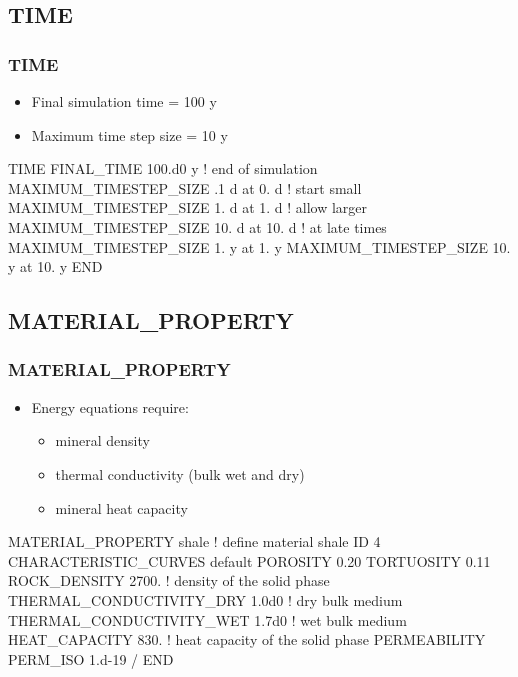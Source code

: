 \documentclass{beamer}
\newcommand\redcomment[1]{{{\color{red} #1}}}
\newcommand\bluecomment[1]{{{\color{blue} #1}}}
\newcommand\greencomment[1]{{{\color{green} #1}}}
\begin{document}
\subsection{TIME}

\begin{frame}[fragile]\frametitle{TIME}
\begin{itemize}
  \item \redcomment{Final} simulation \redcomment{time} = 100 y
  \item \redcomment{Maximum time step size} = 10 y
\end{itemize}

\begin{semiverbatim}

TIME
  FINAL_TIME 100.d0 y \bluecomment{! end of simulation}
  MAXIMUM_TIMESTEP_SIZE .1 d at 0. d \bluecomment{! start small}
  MAXIMUM_TIMESTEP_SIZE 1. d at 1. d \bluecomment{! allow larger}
  MAXIMUM_TIMESTEP_SIZE 10. d at 10. d \bluecomment{! at late times}
  MAXIMUM_TIMESTEP_SIZE 1. y at 1. y
  MAXIMUM_TIMESTEP_SIZE 10. y at 10. y
END
\end{semiverbatim}

\end{frame}

\subsection{MATERIAL\_PROPERTY}

\begin{frame}[fragile]\frametitle{MATERIAL\_PROPERTY}
\begin{itemize}
  \item Energy equations require:
  \begin{itemize}
    \item \redcomment{mineral density}
    \item \redcomment{thermal conductivity} (bulk wet and dry)
    \item \redcomment{mineral heat capacity}
  \end{itemize}
\end{itemize}

\begin{semiverbatim}\small
MATERIAL_PROPERTY shale \bluecomment{! define material} \greencomment{shale}
  ID 4
  CHARACTERISTIC_CURVES default
  POROSITY 0.20
  TORTUOSITY 0.11
  ROCK_DENSITY 2700. \bluecomment{! density of the solid phase}
  THERMAL_CONDUCTIVITY_DRY 1.0d0 \bluecomment{! dry bulk medium}
  THERMAL_CONDUCTIVITY_WET 1.7d0 \bluecomment{! wet bulk medium}
  HEAT_CAPACITY 830. \bluecomment{! heat capacity of the solid phase}
  PERMEABILITY
    PERM_ISO 1.d-19
  /
END
\end{semiverbatim}
\end{frame}
\end{document}
